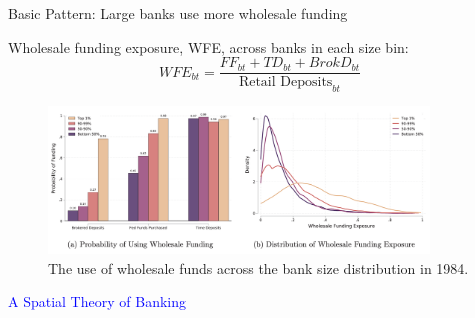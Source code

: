 \documentclass[notes,10pt, aspectratio=169]{beamer}
\begin{document}
    \begin{frame}{Basic Pattern: Large banks use more wholesale funding}

Wholesale funding exposure, WFE, across banks in each size bin:
        $$WFE_{bt} = \frac{FF_{bt} + TD_{bt} + BrokD_{bt}}{\text{Retail Deposits}_{bt}}$$
        
        \begin{figure}
            \centering
            \includegraphics[width=0.9\textwidth]{imgs/fig6.png}
            \caption*{ The use of wholesale funds across the bank size distribution in 1984.}
            \label{fig:my_label}
        \end{figure}
        
        \end{frame}


\begin{frame}[noframenumbering]

\huge \centering \textcolor{blue}{A Spatial Theory of Banking}

\end{frame}
    
\end{document}
